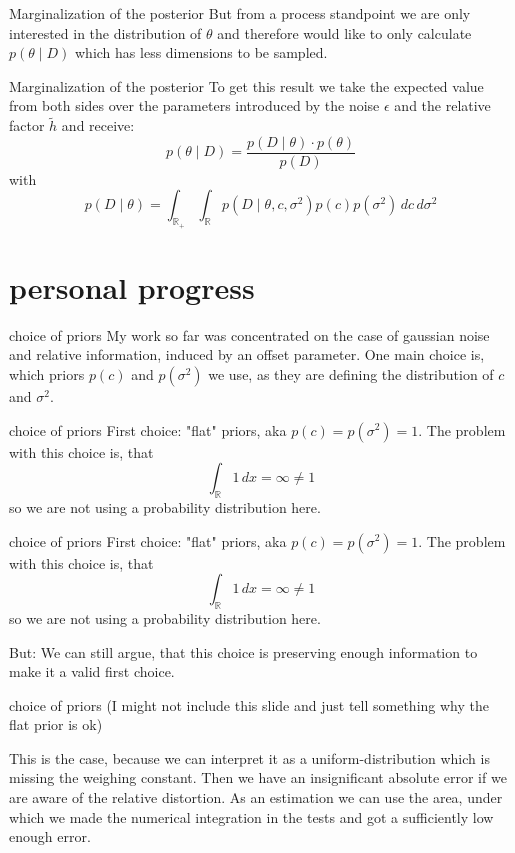 \documentclass{beamer}
\newcommand{\s}{\sigma^2}
\begin{document}
	\begin{frame}{Marginalization of the posterior}
  		But from a process standpoint we are only 
  		interested in the distribution of $\theta$ and therefore would like to 
  		only calculate $p(\theta \mid D)$ which has less dimensions to be sampled.
  	\end{frame}
  	
  	\begin{frame}{Marginalization of the posterior}
		To get this result we take the expected value from both sides over the 
		parameters introduced by the noise $\epsilon$ and the relative factor 
		$\tilde{h}$ and receive:
		\[
			p(\theta \mid D) = \frac{p(D \mid \theta) \cdot p(\theta)}{p(D)}
		\]
		with 
		\[
			p(D \mid \theta) = \int_{\mathbb{R}_+} \int_{\mathbb{R}} p(D \mid 
			\theta,c,\s) p(c) p(\s) \, dc \, d\s
		\]
  	\end{frame}  
  
\section{personal progress}

\begin{frame}{choice of priors}
	My work so far was concentrated on the case of gaussian noise and relative 
	information, induced by an offset parameter.
	One main choice is, which priors $p(c)$ and $p(\s)$ we use, as they are 
	defining the distribution of $c$ and $\s$.
\end{frame}

\begin{frame}{choice of priors}
	First choice: "flat" priors, aka $p(c) = p(\s) = 1$. The problem with this
	choice is, that
	\[
		\int_\mathbb{R} 1 \, dx = \infty \neq 1
	\]
	so we are not using a probability distribution here.
\end{frame}

\begin{frame}{choice of priors}
	First choice: "flat" priors, aka $p(c) = p(\s) = 1$. The problem with this
	choice is, that
	\[
		\int_\mathbb{R} 1 \, dx = \infty \neq 1
	\]
	so we are not using a probability distribution here.
	
	\vspace{1cm}
	\alert{But}: We can still argue, that this choice is preserving enough 
	information to make it a valid first choice.
\end{frame}

\begin{frame}{choice of priors}
	(I might not include this slide and just tell something why the flat prior is 		ok)
	
	This is the case, because we can interpret it as a uniform-distribution which
	is missing the weighing constant. Then we have an insignificant absolute error 
	if we are aware of the relative distortion.	As an estimation we can use the 
	area, under which we made the numerical integration in the tests and got a 
	sufficiently low enough error.
\end{frame}
\end{document}
